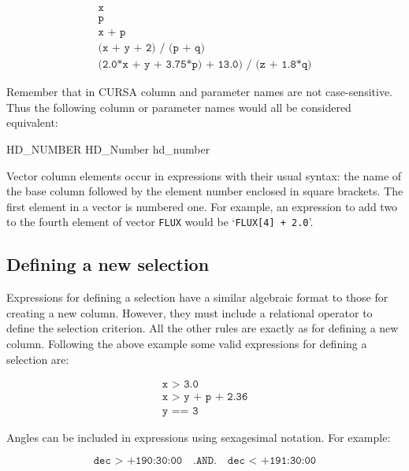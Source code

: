 \documentclass[twoside,11pt]{starlink}
\begin{document}
\begin{equation}
\begin{array}{l}
\texttt{x}  \\
\texttt{p}  \\
\texttt{x + p}  \\
\texttt{(x + y + 2) / (p + q)}  \\
\texttt{(2.0*x + y + 3.75*p) + 13.0) / (z + 1.8*q)}
\end{array}
\end{equation}

Remember that in CURSA column and parameter names are not case-sensitive.
Thus the following column or parameter names would all be considered
equivalent:

\begin{terminalv}
HD_NUMBER
HD_Number
hd_number
\end{terminalv}

Vector column elements occur in expressions with their usual syntax:
the name of the base column followed by the element number enclosed
in square brackets. The first element in a vector is numbered one. For
example, an expression to add two to the fourth element of vector
\texttt{FLUX} would be `\texttt{FLUX[4] + 2.0}'.

\subsection{Defining a new selection}

Expressions for defining a selection have a similar algebraic format to
those for creating a new column.  However, they must include a
relational operator to define the selection criterion.  All the other
rules are exactly as for defining a new column.  Following the above
example some valid expressions for defining a selection are:

\begin{equation}
\begin{array}{l}
\texttt{x > 3.0}  \\
\texttt{x > y + p + 2.36}  \\
\texttt{y == 3}
\end{array}
\end{equation}

Angles can be included in expressions using sexagesimal notation.  For
example:

\begin{equation}
\texttt{dec > +190:30:00 ~ .AND. ~ dec < +191:30:00}
\end{equation}
\end{document}
